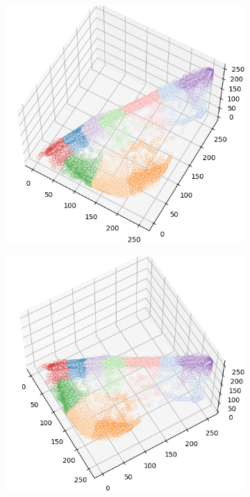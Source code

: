 \begin{figure}[htbp]
\begin{subfigure}[t]{0.32\textwidth}
    \end{subfigure}
    \begin{subfigure}[t]{0.32\textwidth}
        \includegraphics[width=\linewidth]{../../python_code/plots/kmeans/flower-6/clusters_elev60_azim-60.png}
    \end{subfigure}
    \begin{subfigure}[t]{0.32\textwidth}
        \includegraphics[width=\linewidth]{../../python_code/plots/kmeans/flower-6/clusters_elev60_azim-30.png}

\end{subfigure}
\end{figure}

